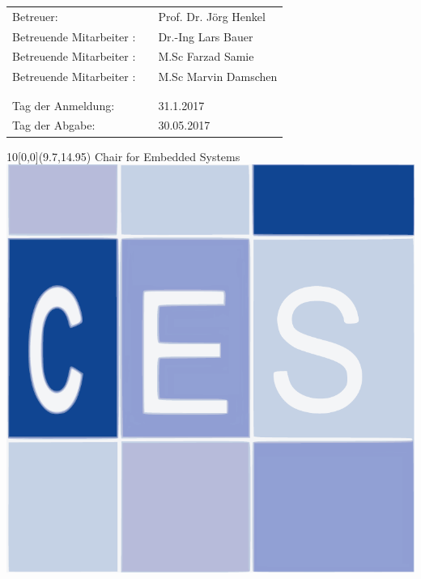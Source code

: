 \begin{titlepage}
{\vspace*{3cm}
\normalsize{
\begin{tabular}[ht]{l c l}
   Betreuer: & \medskip  & Prof. Dr. J\"org Henkel\\
   Betreuende Mitarbeiter : &\medskip & Dr.-Ing Lars Bauer \\
   Betreuende Mitarbeiter : &\medskip & M.Sc Farzad Samie \\
   Betreuende Mitarbeiter : &\medskip & M.Sc Marvin Damschen \\
 & & \\
 & & \\
%
%
  Tag der Anmeldung: & \medskip  & 31.1.2017\\
  Tag der Abgabe: & \medskip & 30.05.2017\\

\end{tabular}
}

}

\begin{textblock}{10}[0,0](9.7,14.95)
Chair for Embedded Systems
 \includegraphics[width=.07\textwidth]{CESlogo.pdf}
\end{textblock}


\end{titlepage} 
